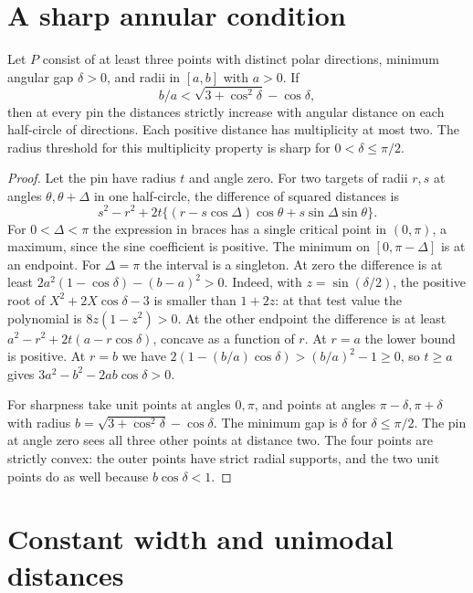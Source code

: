\section{A sharp annular condition}

\begin{theorem}[982-M06]
Let \(P\) consist of at least three points with distinct polar directions, minimum
angular gap \(\delta>0\), and radii in \([a,b]\) with \(a>0\). If
\[
 b/a<\sqrt{3+\cos^2\delta}-\cos\delta,
\]
then at every pin the distances strictly increase with angular distance on each
half-circle of directions. Each positive distance has multiplicity at most two.
The radius threshold for this multiplicity property is sharp for \(0<\delta\le\pi/2\).
\end{theorem}
\begin{proof}
Let the pin have radius \(t\) and angle zero. For two targets of radii \(r,s\) at angles
\(\theta,\theta+\Delta\) in one half-circle, the difference of squared distances is
\[
 s^2-r^2+2t\{(r-s\cos\Delta)\cos\theta+s\sin\Delta\sin\theta\}.
\]
For \(0<\Delta<\pi\) the expression in braces has a single critical point in
\((0,\pi)\), a maximum, since the sine coefficient is positive. The minimum on
\([0,\pi-\Delta]\) is at an endpoint. For \(\Delta=\pi\) the interval is a singleton.
At zero the difference is at least \(2a^2(1-\cos\delta)-(b-a)^2>0\).
Indeed, with \(z=\sin(\delta/2)\), the positive root of
\(X^2+2X\cos\delta-3\) is smaller than \(1+2z\): at that test value the polynomial
is \(8z(1-z^2)>0\). At the other endpoint the difference is at least
\(a^2-r^2+2t(a-r\cos\delta)\), concave as a function of \(r\).
At \(r=a\) the lower bound is positive. At \(r=b\) we have
\(2(1-(b/a)\cos\delta)>(b/a)^2-1\ge0\), so \(t\ge a\) gives
\(3a^2-b^2-2ab\cos\delta>0\).

For sharpness take unit points at angles \(0,\pi\), and points at angles
\(\pi-\delta,\pi+\delta\) with radius \(b=\sqrt{3+\cos^2\delta}-\cos\delta\).
The minimum gap is \(\delta\) for \(\delta\le\pi/2\). The pin at angle zero
sees all three other points at distance two. The four points are strictly
convex: the outer points have strict radial supports, and the two unit points
do as well because \(b\cos\delta<1\).
\end{proof}

\section{Constant width and unimodal distances}

